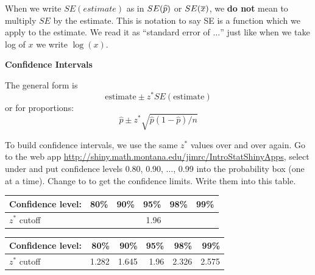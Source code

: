 When we write $SE(estimate)$ as in $SE(\widehat{p})$ or $SE(\overline{x})$, we {\bf
  do not} mean to multiply $SE$ by the estimate. This is notation to
say SE is a function which we apply to the estimate. We read it as
``standard error of $\ldots$'' just like when we take log of $x$ we
write $\log(x)$.  

  \begin{center}
    {\bf Confidence Intervals}
  \end{center}

The general form is 
$$ \mbox{estimate} \pm z^* SE(\mbox{estimate})$$
or for proportions:
$$ \widehat{p} \pm z^*\sqrt{\widehat{p}(1-\widehat{p})/n}$$

To build confidence intervals, we use the same $z^*$ values over and
over again.  Go to the web app
\url{http://shiny.math.montana.edu/jimrc/IntroStatShinyApps}, select
 under  and  put
confidence levels 0.80, 0.90, $\ldots$, 0.99 into the probability box
(one at a time).  Change  to
 to get the confidence limits. Write them into this
table.  \vspace{1cm}
 
\begin{students}
   \begin{tabular}{l|rrrrr}
    Confidence level: &  \hspace{1cm}80\% &  \hspace{1cm}90\% &  \hspace{1cm}95\% & \hspace{1cm} 98\% & \hspace{1cm} 99\% \\ \hline
    $z^*$ cutoff  &  &  & 1.96 &  & 
  \end{tabular}
\end{students}
\begin{key}
   \begin{tabular}{l|rrrrr}
    Confidence level: &  \hspace{1cm}80\% &  \hspace{1cm}90\% &  \hspace{1cm}95\% & \hspace{1cm} 98\% & \hspace{1cm} 99\% \\ \hline
    $z^*$ cutoff  &1.282  &1.645  & 1.96 &2.326& 2.575
  \end{tabular}
\end{key}


